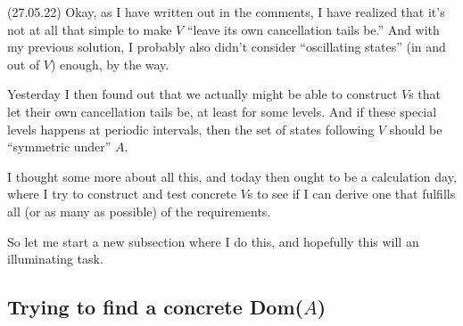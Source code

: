 \documentclass{report}
\begin{document}

(27.05.22) Okay, as I have written out in the comments, I have realized that it's not at all that simple to make $V$ ``leave its own cancellation tails be.'' And with my previous solution, I probably also didn't consider ``oscillating states'' (in and out of $V$) enough, by the way. 

Yesterday I then found out that we actually might be able to construct $V$s that let their own cancellation tails be, at least for some levels. And if these special levels happens at periodic intervals, then the set of states following $V$ should be ``symmetric under'' $A$. 

I thought some more about all this, and today then ought to be a calculation day, where I try to construct and test concrete $V$s to see if I can derive one that fulfills all (or as many as possible) of the requirements. 

So let me start a new subsection where I do this, and hopefully this will an illuminating task.

\subsection{Trying to find a concrete Dom($A$)}
\end{document}
